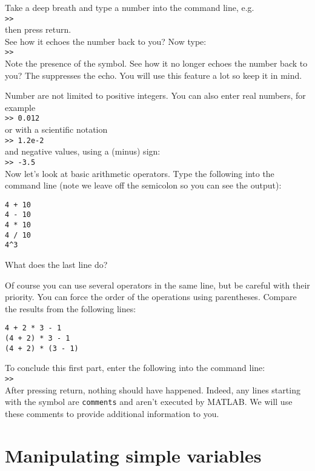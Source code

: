 \documentclass{article}
\begin{document}
Take a deep breath and type a number into the command line, e.g. \\
\verb|>>|  \\
then press return. \\
See how it echoes the number back to you? Now type: \\
\verb|>>|  \\
Note the presence of the \mcode{;} symbol.
See how it no longer echoes the number back to you?
The \mcode{;} suppresses the echo.
You will use this feature a lot so keep it in mind.

Number are not limited to positive integers.
You can also enter real numbers, for example \\
\verb|>> 0.012| \\
or with a scientific notation \\
\verb|>> 1.2e-2| \\
and negative values, using a \mcode{-} (minus) sign:\\
\verb|>> -3.5| \\

Now let's look at basic arithmetic operators.
Type the following into the command line (note we leave off the semicolon so you can see the output):
\begin{lstlisting}
4 + 10
4 - 10
4 * 10
4 / 10
4^3
\end{lstlisting}
What does the last line  do?

Of course you can use several operators in the same line, but be careful with their priority.
You can force the order of the operations using parentheses.
Compare the results from the following lines:
\begin{lstlisting}
4 + 2 * 3 - 1
(4 + 2) * 3 - 1
(4 + 2) * (3 - 1)
\end{lstlisting}

To conclude this first part, enter the following into the command line: \\
\verb|>>|  \\
After pressing return, nothing should have happened.
Indeed, any lines starting with the \mcode{\%} symbol are \verb|comments| and aren't executed by MATLAB.
We will use these comments to provide additional information to you.


\section{Manipulating simple variables}
\end{document}
